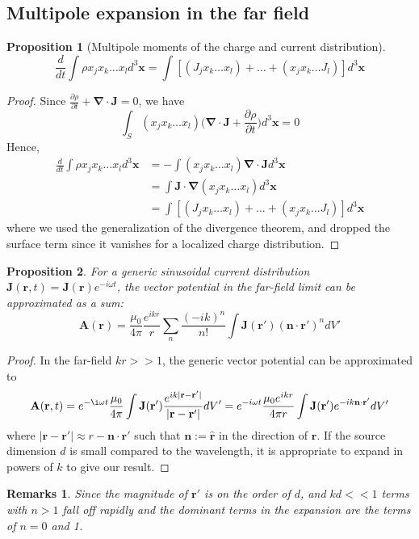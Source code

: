 \documentclass[a4paper]{article}
\newtheorem{remarks}{Remarks}[section]
\theoremstyle{new}
\newtheorem{prop}{Proposition}[section]
\begin{document}
\subsection{Multipole expansion in the far field}
\begin{prop}[Multipole moments of the charge and current distribution]
$$\frac{d}{dt}\int\rho x_jx_k\dots x_ld^3\mathbf{x}=\int[(J_jx_k\dots x_l)+\dots+(x_jx_k\dots J_l)]d^3\mathbf{x}$$
\end{prop}
\begin{proof}
Since $\frac{\partial\rho}{\partial t}+\boldsymbol{\nabla}\cdot\mathbf{J}=0$, we have
$$\int_S(x_jx_k\dots x_l)\bigg(\boldsymbol{\nabla}\cdot\mathbf{J}+\frac{\partial\rho}{\partial t}\bigg)d^3\mathbf{x}=0$$
Hence,
\begin{align}
\frac{d}{dt}\int\rho x_jx_k\dots x_ld^3\mathbf{x}&=-\int(x_jx_k\dots x_l)\boldsymbol{\nabla}\cdot\mathbf{J}d^3\mathbf{x}\nonumber\\&=\int\mathbf{J}\cdot\boldsymbol{\nabla}(x_jx_k\dots x_l)d^3\mathbf{x}\nonumber\\&=\int[(J_jx_k\dots x_l)+\dots+(x_jx_k\dots J_l)]d^3\mathbf{x}\nonumber
\end{align}
where we used the generalization of the divergence theorem, and dropped the surface term since it vanishes for a localized charge distribution.
\end{proof}
\begin{prop}
For a generic sinusoidal current distribution $\mathbf{J}(\mathbf{r},t)=\mathbf{J}(\mathbf{r})e^{-i\omega t}$, the vector potential in the far-field limit can be approximated as a sum:
$$\mathbf{A}(\mathbf{r})=\frac{\mu_0}{4\pi}\frac{e^{ikr}}{r}\sum_n\frac{(-ik)^n}{n!}\int\mathbf{J}(\mathbf{r'})(\mathbf{n}\cdot\mathbf{r'})^ndV'$$
\end{prop}
\begin{proof}
In the far-field $kr>>1$, the generic vector potential can be approximated to 
$$\mathbf{A}(\mathbf{r},t)=e^{-\i\omega t}\frac{\mu_0}{4\pi}\int\mathbf{J}(\mathbf{r'})\frac{e^{ik|\mathbf{r}-\mathbf{r'}|}}{|\mathbf{r}-\mathbf{r'}|}dV'=e^{-i\omega t}\frac{\mu_0e^{ikr}}{4\pi r}\int\mathbf{J}(\mathbf{r'})e^{-ik\mathbf{n}\cdot\mathbf{r'}}dV'$$
where $|\mathbf{r}-\mathbf{r'}|\approx r-\mathbf{n}\cdot\mathbf{r'}$ such that $\mathbf{n}:=\mathbf{\hat{r}}$ in the direction of $\mathbf{r}$. If the source dimension $d$ is small compared to the wavelength, it is appropriate to expand in powers of $k$ to give our result.
\end{proof}
\begin{remarks}
Since the magnitude of $\mathbf{r'}$ is on the order of $d$, and $kd<<1$ terms with $n>1$ fall off rapidly and the dominant terms in the expansion are the terms of $n=0$ and 1.
\end{remarks}
\end{document}
